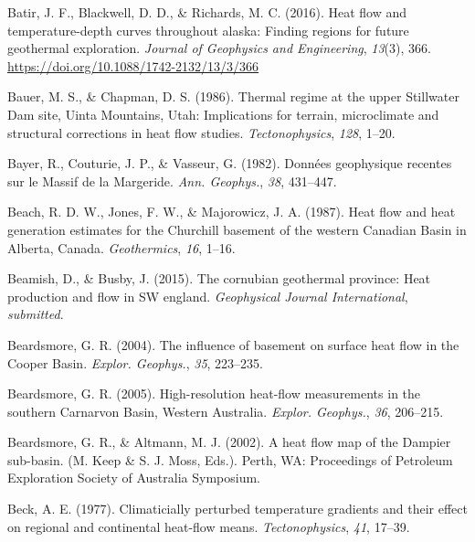 \documentclass[draft,linenumbers]{agujournal2018}
\begin{document}
\leavevmode{}%
Batir, J. F., Blackwell, D. D., \& Richards, M. C. (2016). Heat flow and
temperature-depth curves throughout alaska: Finding regions for future
geothermal exploration. \emph{Journal of Geophysics and Engineering},
\emph{13}(3), 366. \url{https://doi.org/10.1088/1742-2132/13/3/366}

\leavevmode{}%
Bauer, M. S., \& Chapman, D. S. (1986). Thermal regime at the upper
{Stillwater Dam} site, {Uinta Mountains, Utah}: Implications for
terrain, microclimate and structural corrections in heat flow studies.
\emph{Tectonophysics}, \emph{128}, 1--20.

\leavevmode{}%
Bayer, R., Couturie, J. P., \& Vasseur, G. (1982). Donn{é}es geophysique
recentes sur le {Massif de la Margeride}. \emph{Ann. Geophys.},
\emph{38}, 431--447.

\leavevmode{}%
Beach, R. D. W., Jones, F. W., \& Majorowicz, J. A. (1987). Heat flow
and heat generation estimates for the {Churchill} basement of the
western {Canadian Basin} in {Alberta, Canada}. \emph{Geothermics},
\emph{16}, 1--16.

\leavevmode{}%
Beamish, D., \& Busby, J. (2015). The cornubian geothermal province:
Heat production and flow in SW england. \emph{Geophysical Journal
International}, \emph{submitted}.

\leavevmode{}%
Beardsmore, G. R. (2004). The influence of basement on surface heat flow
in the {Cooper Basin}. \emph{Explor. Geophys.}, \emph{35}, 223--235.

\leavevmode{}%
Beardsmore, G. R. (2005). High-resolution heat-flow measurements in the
southern {Carnarvon Basin, Western Australia}. \emph{Explor. Geophys.},
\emph{36}, 206--215.

\leavevmode{}%
Beardsmore, G. R., \& Altmann, M. J. (2002). A heat flow map of the
{Dampier} sub-basin. (M. Keep \& S. J. Moss, Eds.). Perth, WA:
Proceedings of Petroleum Exploration Society of Australia Symposium.

\leavevmode{}%
Beck, A. E. (1977). Climaticially perturbed temperature gradients and
their effect on regional and continental heat-flow means.
\emph{Tectonophysics}, \emph{41}, 17--39.
\end{document}
